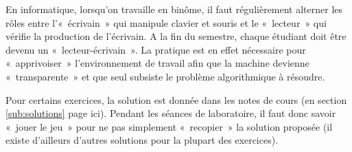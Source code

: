\begin{description}
	En informatique, lorsqu'on travaille en binôme, il faut régulièrement 
	alterner les rôles entre l'«~écrivain~» qui manipule clavier et souris 
	et le «~lecteur~» qui vérifie la production de l'écrivain. A la fin
	du semestre, chaque étudiant doit être devenu un «~lecteur-écrivain~».
	La pratique est en effet nécessaire pour «~apprivoiser~» l'environnement 
	de travail afin que la machine devienne «~transparente~» et que seul 
	subsiste le problème algorithmique à résoudre.
	
	Pour certains exercices, la solution est donnée dans les notes de cours
	(en section \ref{sub:solutions} page \pageref{sub:solutions} ici).
	Pendant les séances de laboratoire, il faut donc savoir «~jouer le jeu~»
	pour ne pas simplement «~recopier~» la solution proposée (il existe
	d'ailleurs d'autres solutions pour la plupart des exercices).
	

\end{description}
